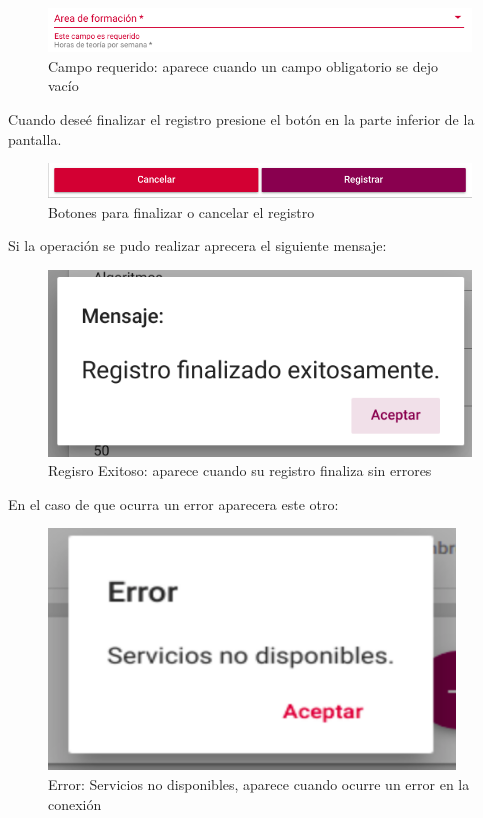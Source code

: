 \begin{figure}[H]
    \centering
    \hypertarget{requeridoR}{\includegraphics[width=0.7\linewidth]{images/GUA/requerido}}
    \caption{Campo requerido: aparece cuando un campo obligatorio se dejo vacío}
    \label{requeridoR}
\end{figure}
Cuando deseé finalizar el registro presione el botón  en la parte inferior de la pantalla.\\
\begin{figure}[H]
    \centering
    \hypertarget{registrarBtnR}{\includegraphics[width=0.7\linewidth]{images/GUA/registrarBtn}}
    \caption{Botones para finalizar o cancelar el registro}
    \label{registrarBtnR}
\end{figure}
Si la operación se pudo realizar aprecera el siguiente mensaje:\\
\begin{figure}[H]
    \centering
    \hypertarget{exito}{\includegraphics[width=0.7\linewidth]{images/GUA/exito}}
    \caption{Regisro Exitoso: aparece cuando su registro finaliza sin errores}
    \label{exito}
\end{figure}
En el caso de que ocurra un error aparecera este otro:\\
\begin{figure}[H]
    \centering
    \hypertarget{errorR}{\includegraphics[width=0.7\linewidth]{images/GUA/error}}
    \caption{Error: Servicios no disponibles, aparece cuando ocurre un error en la conexión}
    \label{errorR}
\end{figure}

